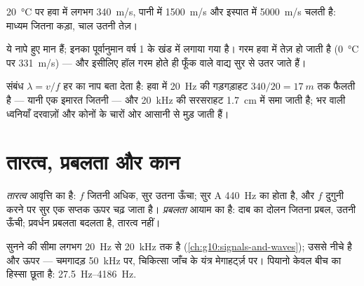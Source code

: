 \begin{proposition}[ध्वनि की चाल]\label{prop:g12:sound-acoustics:speed}
%
 \qty{20}{\degreeCelsius} पर हवा में लगभग \qty{340}{m/s}, पानी में \qty{1500}{m/s} और इस्पात में
\qty{5000}{m/s} चलती है: माध्यम जितना कड़ा, चाल उतनी तेज़। \admitted
\end{proposition}

\begin{remark}[गरम हवा तेज़ होती है]\label{rem:g12:sound-acoustics:temperature}
ये नापे हुए मान हैं; इनका पूर्वानुमान वर्ष 1 के खंड में लगाया गया है।
 गरम हवा में तेज़ हो जाती है (\qty{0}{\degreeCelsius} पर \qty{331}{m/s}) --- और इसीलिए
हॉल गरम होते ही फूँक वाले वाद्य सुर से उतर जाते हैं।
\end{remark}

\begin{example}[ध्वनियों के नाप]\label{ex:g12:sound-acoustics:wavelengths}
संबंध $\lambda = v/f$ हर  का नाप बता देता है: हवा में \qty{20}{Hz} की गड़गड़ाहट
$340/20 = \qty{17}{m}$ तक फैलती है --- यानी एक इमारत जितनी --- और \qty{20}{kHz} की सरसराहट \qty{1.7}{cm}
में समा जाती है;  भर वाली ध्वनियाँ दरवाज़ों और कोनों के चारों ओर आसानी से
मुड़ जाती हैं।
\end{example}

\section{तारत्व, प्रबलता और कान}

\begin{definition}[तारत्व और प्रबलता]\label{def:g12:sound-acoustics:pitch-loudness}
\emph{तारत्व} आवृत्ति का  है: $f$ जितनी
अधिक, सुर उतना ऊँचा; सुर A \qty{440}{Hz} का होता है, और $f$ दुगुनी करने पर सुर
एक सप्तक ऊपर चढ़ जाता है। \emph{प्रबलता} आयाम का
 है: दाब का दोलन जितना प्रबल,  उतनी ऊँची; प्रवर्धन
प्रबलता बदलता है, तारत्व नहीं।
\end{definition}

\begin{remark}[कान की खिड़की]\label{rem:g12:sound-acoustics:audible}
सुनने की सीमा लगभग \qty{20}{Hz} से \qty{20}{kHz} तक है (\cref{ch:g10:signals-and-waves}); उससे नीचे
 है और ऊपर  --- चमगादड़ \qty{50}{kHz} पर, चिकित्सा
जाँच के यंत्र मेगाहर्ट्ज़ पर। पियानो केवल बीच का हिस्सा छूता है:
\qtyrange{27.5}{4186}{Hz}.
\end{remark}

